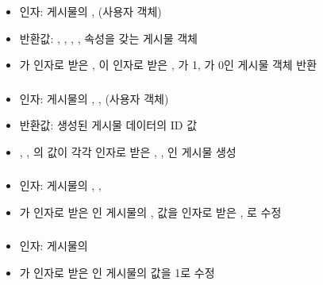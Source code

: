 \subsubsection*{}
\begin{itemize}
    \item 인자: 게시물의 ,  (사용자 객체)
    \item 반환값: , , , ,  속성을 갖는 게시물 객체
    \item {}가 인자로 받은 , 이 인자로 받은 , 가 1, 가 0인 게시물 객체 반환
\end{itemize}

\subsubsection*{}
\begin{itemize}
    \item 인자: 게시물의 , ,  (사용자 객체)
    \item 반환값: 생성된 게시물 데이터의 ID 값
    \item {}, , 의 값이 각각 인자로 받은 , , 인 게시물 생성
\end{itemize}

\subsubsection*{}
\begin{itemize}
    \item 인자: 게시물의 , , 
    \item {}가 인자로 받은 인 게시물의 ,  값을 인자로 받은 , 로 수정
\end{itemize}

\subsubsection*{}
\begin{itemize}
    \item 인자: 게시물의 
    \item {}가 인자로 받은 인 게시물의  값을 1로 수정
\end{itemize}

